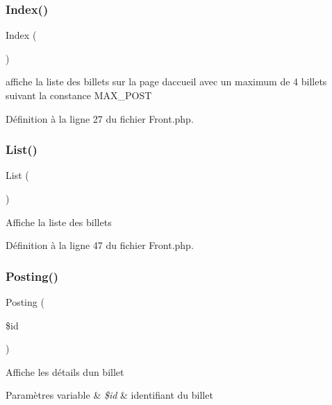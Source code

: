 \subsubsection{\texorpdfstring{Index()}{Index()}}
{\footnotesize\ttfamily Index (\begin{DoxyParamCaption}{ }\end{DoxyParamCaption})}

affiche la liste des billets sur la page d\textquotesingle{}accueil avec un maximum de 4 billets suivant la constance M\+A\+X\+\_\+\+P\+O\+ST 

Définition à la ligne 27 du fichier Front.\+php.

\mbox{\label{class_src_1_1_controllers_1_1_front_a17e6c90f14225bdac5c65ed915b0a2f6}} 
\subsubsection{\texorpdfstring{List()}{List()}}
{\footnotesize\ttfamily List (\begin{DoxyParamCaption}{ }\end{DoxyParamCaption})}

Affiche la liste des billets 

Définition à la ligne 47 du fichier Front.\+php.

\mbox{\label{class_src_1_1_controllers_1_1_front_a5fcbe325afb03acc6e4eaec38a7bb1ae}} 
\subsubsection{\texorpdfstring{Posting()}{Posting()}}
{\footnotesize\ttfamily Posting (\begin{DoxyParamCaption}\item[{}]{\$id }\end{DoxyParamCaption})}

Affiche les détails d\textquotesingle{}un billet 
\begin{DoxyParams}[1]{Paramètres}
variable & {\em \$id} & identifiant du billet \\
\hline
\end{DoxyParams}


